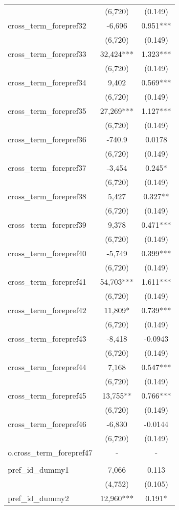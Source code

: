 \documentclass[]{article}
\begin{document}
\begin{tabular}{lcc}
 & (6,720) & (0.149) \\
cross\_term\_forepref32 & -6,696 & 0.951*** \\
 & (6,720) & (0.149) \\
cross\_term\_forepref33 & 32,424*** & 1.323*** \\
 & (6,720) & (0.149) \\
cross\_term\_forepref34 & 9,402 & 0.569*** \\
 & (6,720) & (0.149) \\
cross\_term\_forepref35 & 27,269*** & 1.127*** \\
 & (6,720) & (0.149) \\
cross\_term\_forepref36 & -740.9 & 0.0178 \\
 & (6,720) & (0.149) \\
cross\_term\_forepref37 & -3,454 & 0.245* \\
 & (6,720) & (0.149) \\
cross\_term\_forepref38 & 5,427 & 0.327** \\
 & (6,720) & (0.149) \\
cross\_term\_forepref39 & 9,378 & 0.471*** \\
 & (6,720) & (0.149) \\
cross\_term\_forepref40 & -5,749 & 0.399*** \\
 & (6,720) & (0.149) \\
cross\_term\_forepref41 & 54,703*** & 1.611*** \\
 & (6,720) & (0.149) \\
cross\_term\_forepref42 & 11,809* & 0.739*** \\
 & (6,720) & (0.149) \\
cross\_term\_forepref43 & -8,418 & -0.0943 \\
 & (6,720) & (0.149) \\
cross\_term\_forepref44 & 7,168 & 0.547*** \\
 & (6,720) & (0.149) \\
cross\_term\_forepref45 & 13,755** & 0.766*** \\
 & (6,720) & (0.149) \\
cross\_term\_forepref46 & -6,830 & -0.0144 \\
 & (6,720) & (0.149) \\
o.cross\_term\_forepref47 & - & - \\
 &  &  \\
pref\_id\_dummy1 & 7,066 & 0.113 \\
 & (4,752) & (0.105) \\
pref\_id\_dummy2 & 12,960*** & 0.191* \\

\end{tabular}
\end{document}
